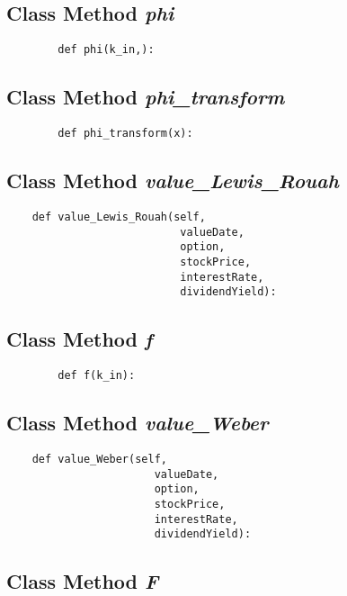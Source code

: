 \documentclass[twoside,11pt]{book}
\begin{document}
\subsection{Class Method {\it phi}}


\begin{lstlisting}
        def phi(k_in,):
\end{lstlisting}

\subsection{Class Method {\it phi\_transform}}


\begin{lstlisting}
        def phi_transform(x):
\end{lstlisting}

\subsection{Class Method {\it value\_Lewis\_Rouah}}


\begin{lstlisting}
    def value_Lewis_Rouah(self,
                           valueDate,
                           option,
                           stockPrice,
                           interestRate,
                           dividendYield):
\end{lstlisting}

\subsection{Class Method {\it f}}


\begin{lstlisting}
        def f(k_in):
\end{lstlisting}

\subsection{Class Method {\it value\_Weber}}


\begin{lstlisting}
    def value_Weber(self,
                       valueDate,
                       option,
                       stockPrice,
                       interestRate,
                       dividendYield):
\end{lstlisting}

\subsection{Class Method {\it F}}
\end{document}

